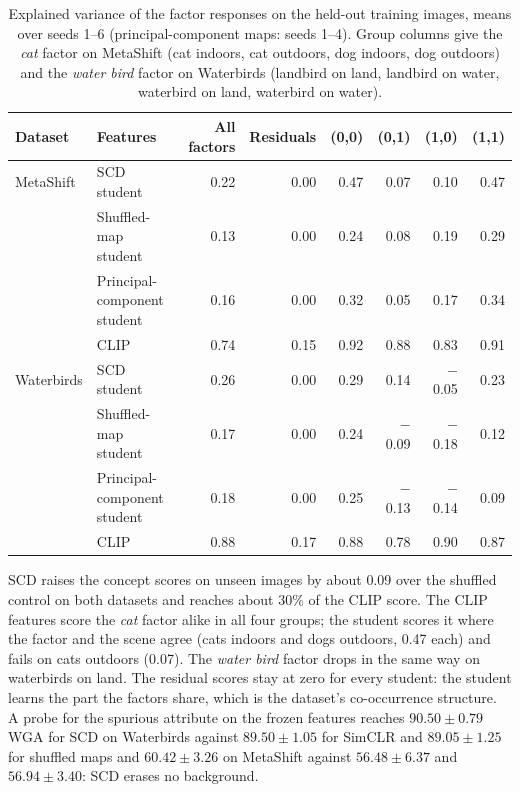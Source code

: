 \documentclass{article}
\begin{document}
\begin{table}[htbp]
\centering\small
\setlength{\tabcolsep}{4pt}
\caption{Explained variance of the factor responses on the held-out training images, means over seeds 1--6 (principal-component maps: seeds 1--4). Group columns give the \emph{cat} factor on MetaShift (cat indoors, cat outdoors, dog indoors, dog outdoors) and the \emph{water bird} factor on Waterbirds (landbird on land, landbird on water, waterbird on land, waterbird on water).}
\begin{tabular}{llrrrrrr}
\toprule
Dataset & Features & All factors & Residuals & (0,0) & (0,1) & (1,0) & (1,1) \\
\midrule
MetaShift & SCD student & 0.22 & 0.00 & 0.47 & 0.07 & 0.10 & 0.47 \\
& Shuffled-map student & 0.13 & 0.00 & 0.24 & 0.08 & 0.19 & 0.29 \\
& Principal-component student & 0.16 & 0.00 & 0.32 & 0.05 & 0.17 & 0.34 \\
& CLIP & 0.74 & 0.15 & 0.92 & 0.88 & 0.83 & 0.91 \\
\addlinespace
Waterbirds & SCD student & 0.26 & 0.00 & 0.29 & 0.14 & $-$0.05 & 0.23 \\
& Shuffled-map student & 0.17 & 0.00 & 0.24 & $-$0.09 & $-$0.18 & 0.12 \\
& Principal-component student & 0.18 & 0.00 & 0.25 & $-$0.13 & $-$0.14 & 0.09 \\
& CLIP & 0.88 & 0.17 & 0.88 & 0.78 & 0.90 & 0.87 \\
\bottomrule
\end{tabular}
\label{tab:audit}
\end{table}

SCD raises the concept scores on unseen images by about 0.09 over the shuffled control on both datasets and reaches about 30\% of the CLIP score. The CLIP features score the \emph{cat} factor alike in all four groups; the student scores it where the factor and the scene agree (cats indoors and dogs outdoors, 0.47 each) and fails on cats outdoors (0.07). The \emph{water bird} factor drops in the same way on waterbirds on land. The residual scores stay at zero for every student: the student learns the part the factors share, which is the dataset's co-occurrence structure. A probe for the spurious attribute on the frozen features reaches $90.50\pm0.79$ WGA for SCD on Waterbirds against $89.50\pm1.05$ for SimCLR and $89.05\pm1.25$ for shuffled maps and $60.42\pm3.26$ on MetaShift against $56.48\pm6.37$ and $56.94\pm3.40$: SCD erases no background.
\end{document}
